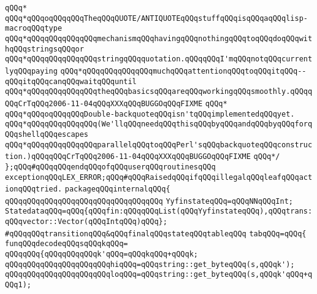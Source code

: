 \verb|qQQq*|\newline
\verb|qQQq*qQQqoqQQqqQQqTheqQQqQUOTE/ANTIQUOTEqQQqstuffqQQqisqQQqaqQQqlisp-macroqQQqtype|\newline
\verb|qQQq*qQQqqQQqqQQqqQQqmechanismqQQqhavingqQQqnothingqQQqtoqQQqdoqQQqwithqQQqstringsqQQqor|\newline
\verb|qQQq*qQQqqQQqqQQqqQQqstringqQQqquotation.qQQqqQQqI'mqQQqnotqQQqcurrentlyqQQqpaying|\newline
\verb|qQQq*qQQqqQQqqQQqqQQqmuchqQQqattentionqQQqtoqQQqitqQQq--qQQqitqQQqcanqQQqwaitqQQquntil|\newline
\verb|qQQq*qQQqqQQqqQQqqQQqtheqQQqbasicsqQQqareqQQqworkingqQQqsmoothly.qQQqqQQqCrTqQQq2006-11-04qQQqXXXqQQqBUGGOqQQqFIXME|\newline
\verb|qQQq*|\newline
\verb|qQQq*qQQqoqQQqqQQqDouble-backquoteqQQqisn'tqQQqimplementedqQQqyet.|\newline
\verb|qQQq*qQQqqQQqqQQqqQQq(We'llqQQqneedqQQqthisqQQqbyqQQqandqQQqbyqQQqforqQQqshellqQQqescapes|\newline
\verb|qQQq*qQQqqQQqqQQqqQQqparallelqQQqtoqQQqPerl'sqQQqbackquoteqQQqconstruction.)qQQqqQQqCrTqQQq2006-11-04qQQqXXXqQQqBUGGOqQQqFIXME|\newline
\verb|qQQq*/|\newline
\verb|};qQQq#qQQqqQQqendqQQqofqQQquserqQQqroutinesqQQq|\newline
\verb|exceptionqQQqLEX_ERROR;qQQq#qQQqRaisedqQQqifqQQqillegalqQQqleafqQQqactionqQQqtried.|\newline
\verb|packageqQQqinternalqQQq{|\newline
\verb|qQQqqQQqqQQqqQQqqQQqqQQqqQQqqQQqqQQq|\newline
\newline
\verb|YyfinstateqQQq=qQQqNNqQQqInt;|\newline
\verb|StatedataqQQq=qQQq{qQQqfin:qQQqqQQqList(qQQqYyfinstateqQQq),qQQqtrans:qQQqvector::Vector(qQQqIntqQQq)qQQq};|\newline
\verb|#qQQqqQQqtransitionqQQq&qQQqfinalqQQqstateqQQqtableqQQq|\newline
\verb|tabqQQq=qQQq{|\newline
\verb|funqQQqdecodeqQQqsqQQqkqQQq=|\newline
\verb|qQQqqQQq{qQQqqQQqqQQqk'qQQq=qQQqkqQQq+qQQqk;|\newline
\verb|qQQqqQQqqQQqqQQqqQQqqQQqhiqQQq=qQQqstring::get_byteqQQq(s,qQQqk');|\newline
\verb|qQQqqQQqqQQqqQQqqQQqqQQqloqQQq=qQQqstring::get_byteqQQq(s,qQQqk'qQQq+qQQq1);|\newline
